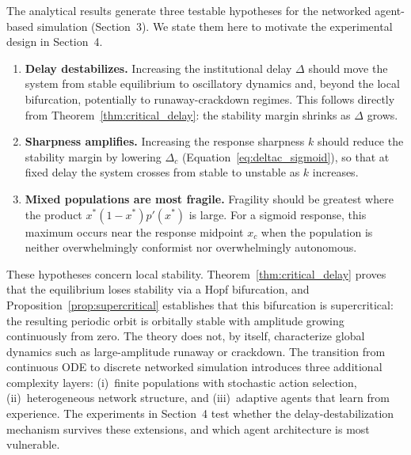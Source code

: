 The analytical results generate three testable hypotheses for the networked agent-based simulation (Section~3). We state them here to motivate the experimental design in Section~4.

\begin{enumerate}
\item \textbf{Delay destabilizes.} Increasing the institutional delay $\Delta$ should move the system from stable equilibrium to oscillatory dynamics and, beyond the local bifurcation, potentially to runaway-crackdown regimes. This follows directly from Theorem~\ref{thm:critical_delay}: the stability margin shrinks as $\Delta$ grows.
\item \textbf{Sharpness amplifies.} Increasing the response sharpness $k$ should reduce the stability margin by lowering $\Delta_c$ (Equation~\ref{eq:deltac_sigmoid}), so that at fixed delay the system crosses from stable to unstable as $k$ increases.
\item \textbf{Mixed populations are most fragile.} Fragility should be greatest where the product $x^*(1-x^*)p'(x^*)$ is large. For a sigmoid response, this maximum occurs near the response midpoint $x_c$ when the population is neither overwhelmingly conformist nor overwhelmingly autonomous.
\end{enumerate}

These hypotheses concern local stability. Theorem~\ref{thm:critical_delay} proves that the equilibrium loses stability via a Hopf bifurcation, and Proposition~\ref{prop:supercritical} establishes that this bifurcation is supercritical: the resulting periodic orbit is orbitally stable with amplitude growing continuously from zero. The theory does not, by itself, characterize global dynamics such as large-amplitude runaway or crackdown. The transition from continuous ODE to discrete networked simulation introduces three additional complexity layers: (i)~finite populations with stochastic action selection, (ii)~heterogeneous network structure, and (iii)~adaptive agents that learn from experience. The experiments in Section~4 test whether the delay-destabilization mechanism survives these extensions, and which agent architecture is most vulnerable.

